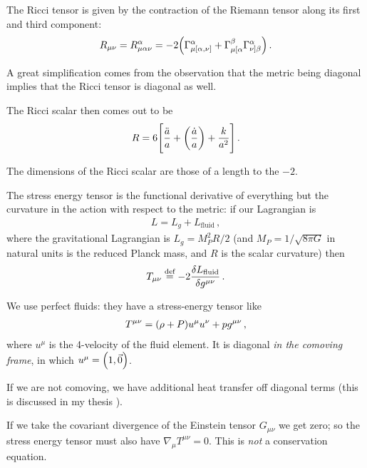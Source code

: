 \documentclass[main.tex]{subfiles}
\begin{document}
The Ricci tensor is given by the contraction of the Riemann tensor along its first and third component:
%
\begin{align}
R_{\mu \nu } = R^{\alpha }_{\mu \alpha \nu }
= -2 \qty(\Gamma^{\alpha }_{\mu [\alpha , \nu ]} + \Gamma^{\beta }_{\mu [\alpha } \Gamma^{\alpha }_{\nu ] \beta  })
\,.
\end{align}

A great simplification comes from the observation that the metric being diagonal implies that the Ricci tensor is diagonal as well. 


The Ricci scalar then comes out to be 
%
\begin{align}
R = 6 \qty[\frac{\ddot{a}}{a} + \qty(\frac{\dot{a}}{a}) + \frac{k}{a^2}]
\,.
\end{align}

The dimensions of the Ricci scalar are those of a length to the \(-2\). 

The stress energy tensor is the functional derivative of everything but the curvature in the action with respect to the metric: if our Lagrangian is 
%
\begin{align}
L = L_{g} + L_{\text{fluid}}
\,,
\end{align}
%
where the gravitational Lagrangian is \(L_{g} = M_P^2 R /2 \) (and \(M_P = 1 / \sqrt{8 \pi G}\) in natural units is the reduced Planck mass, and \(R\) is the scalar curvature) then 
%
\begin{align}
T_{\mu \nu } \overset{\text{def}}{=} -2 \fdv{L_{\text{fluid}}}{g^{\mu \nu }}
\,.
\end{align}


We use perfect fluids: they have a stress-energy tensor like 
%
\begin{align}
T^{\mu \nu } =  \qty(\rho + P) u^{\mu } u^{\nu } + p g^{\mu \nu }
\,,
\end{align}
%
where \(u^{\mu }\) is the 4-velocity of the fluid element. 
It is diagonal \emph{in the comoving frame}, in which \(u^{\mu } = \qty(1, \vec{0})\).

If we are not comoving, we have additional heat transfer off diagonal terms (this is discussed in my thesis \cite[section 4.2]{tissinoRelativisticNonidealFlows2019}). 

If we take the covariant divergence of the Einstein tensor \(G_{\mu \nu }\) we get zero; so the stress energy tensor must also have \(\nabla_{\mu} T^{\mu \nu }=0\). 
This is \emph{not} a conservation equation. 
\end{document}
